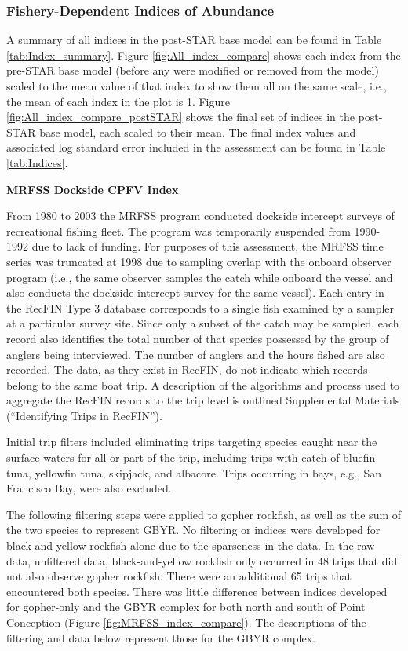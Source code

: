\documentclass[12pt,]{article}
\begin{document}
\subsubsection{Fishery-Dependent Indices of
Abundance}\label{fishery-dependent-indices-of-abundance}

A summary of all indices in the post-STAR base model can be found in
Table \ref{tab:Index_summary}. Figure \ref{fig:All_index_compare} shows
each index from the pre-STAR base model (before any were modified or
removed from the model) scaled to the mean value of that index to show
them all on the same scale, i.e., the mean of each index in the plot is
1. Figure \ref{fig:All_index_compare_postSTAR} shows the final set of
indices in the post-STAR base model, each scaled to their mean. The
final index values and associated log standard error included in the
assessment can be found in Table \ref{tab:Indices}.

\textbf{MRFSS Dockside CPFV Index}

From 1980 to 2003 the MRFSS program conducted dockside intercept surveys
of recreational fishing fleet. The program was temporarily suspended
from 1990-1992 due to lack of funding. For purposes of this assessment,
the MRFSS time series was truncated at 1998 due to sampling overlap with
the onboard observer program (i.e., the same observer samples the catch
while onboard the vessel and also conducts the dockside intercept survey
for the same vessel). Each entry in the RecFIN Type 3 database
corresponds to a single fish examined by a sampler at a particular
survey site. Since only a subset of the catch may be sampled, each
record also identifies the total number of that species possessed by the
group of anglers being interviewed. The number of anglers and the hours
fished are also recorded. The data, as they exist in RecFIN, do not
indicate which records belong to the same boat trip. A description of
the algorithms and process used to aggregate the RecFIN records to the
trip level is outlined Supplemental Materials (``Identifying Trips in
RecFIN'').

Initial trip filters included eliminating trips targeting species caught
near the surface waters for all or part of the trip, including trips
with catch of bluefin tuna, yellowfin tuna, skipjack, and albacore.
Trips occurring in bays, e.g., San Francisco Bay, were also excluded.

The following filtering steps were applied to gopher rockfish, as well
as the sum of the two species to represent GBYR. No filtering or indices
were developed for black-and-yellow rockfish alone due to the sparseness
in the data. In the raw data, unfiltered data, black-and-yellow rockfish
only occurred in 48 trips that did not also observe gopher rockfish.
There were an additional 65 trips that encountered both species. There
was little difference between indices developed for gopher-only and the
GBYR complex for both north and south of Point Conception (Figure
\ref{fig:MRFSS_index_compare}). The descriptions of the filtering and
data below represent those for the GBYR complex.
\end{document}
